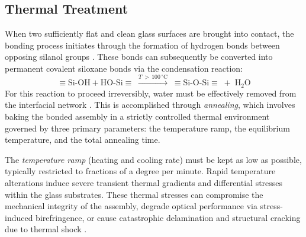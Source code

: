 \subsection{Thermal Treatment}
\label{sec:thermal}
When two sufficiently flat and clean glass surfaces are brought into contact, 
the bonding process initiates through the formation of hydrogen bonds between 
opposing silanol groups \cite{kissinger1990}. These bonds can subsequently be 
converted into permanent covalent siloxane bonds via the condensation reaction:
\begin{equation}
    \equiv\!\mathrm{Si}\text{-}\mathrm{OH} + 
    \mathrm{HO}\text{-}\mathrm{Si}\!\equiv 
    \;\xrightarrow{T\,>\,100\,^\circ\mathrm{C}}\; 
    \equiv\!\mathrm{Si}\text{-}\mathrm{O}\text{-}\mathrm{Si}\!\equiv 
    \;+\; \mathrm{H_2O}
    \label{eq:siloxane2}
\end{equation}
For this reaction to proceed irreversibly, water must be effectively removed from the 
interfacial network \cite{rammhandbook}. This is accomplished through \textit{annealing}, 
which involves baking the bonded assembly in a strictly controlled thermal environment 
governed by three primary parameters: the temperature ramp, the equilibrium temperature, 
and the total annealing time.

The \textit{temperature ramp} (heating and cooling rate) must be kept as low as possible, 
typically restricted to fractions of a degree per minute. Rapid temperature alterations 
induce severe transient thermal gradients and differential stresses within the glass 
substrates. These thermal stresses can compromise the mechanical integrity of the assembly, 
degrade optical performance via stress-induced birefringence, or cause catastrophic 
delamination and structural cracking due to thermal shock \cite{yoder2018}.

